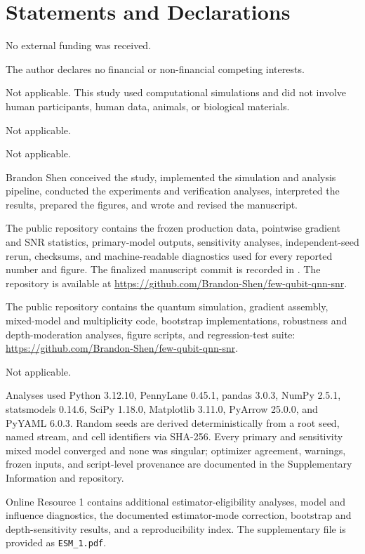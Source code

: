 \documentclass[pdflatex,sn-basic,Numbered]{sn-jnl}
\newcommand{\ttf}[1]{\texttt{\seqsplit{#1}}}
\begin{document}
\backmatter

\section*{Statements and Declarations}

 No external funding was received.

 The author declares no financial or non-financial competing interests.

 Not applicable. This study used computational simulations and did not involve human participants, human data, animals, or biological materials.

 Not applicable.

 Not applicable.

 Brandon Shen conceived the study, implemented the simulation and analysis pipeline, conducted the experiments and verification analyses, interpreted the results, prepared the figures, and wrote and revised the manuscript.

 The public repository contains the frozen production data, pointwise gradient and SNR statistics, primary-model outputs, sensitivity analyses, independent-seed rerun, checksums, and machine-readable diagnostics used for every reported number and figure. The finalized manuscript commit is recorded in \ttf{MANUSCRIPT\_COMMIT.txt}. The repository is available at \url{https://github.com/Brandon-Shen/few-qubit-qnn-snr}.

 The public repository contains the quantum simulation, gradient assembly, mixed-model and multiplicity code, bootstrap implementations, robustness and depth-moderation analyses, figure scripts, and regression-test suite: \url{https://github.com/Brandon-Shen/few-qubit-qnn-snr}.

 Not applicable.

 Analyses used Python 3.12.10, PennyLane 0.45.1, pandas 3.0.3, NumPy 2.5.1, statsmodels 0.14.6, SciPy 1.18.0, Matplotlib 3.11.0, PyArrow 25.0.0, and PyYAML 6.0.3. Random seeds are derived deterministically from a root seed, named stream, and cell identifiers via SHA-256. Every primary and sensitivity mixed model converged and none was singular; optimizer agreement, warnings, frozen inputs, and script-level provenance are documented in the Supplementary Information and repository.

 Online Resource 1 contains additional estimator-eligibility analyses, model and influence diagnostics, the documented estimator-mode correction, bootstrap and depth-sensitivity results, and a reproducibility index. The supplementary file is provided as \texttt{ESM\_1.pdf}.


\end{document}
